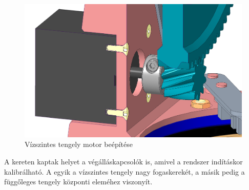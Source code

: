 \documentclass[12pt,a4paper]{article}
\begin{document}
\begin{figure}[h!]
	\centering
	\includegraphics[width=1 \linewidth]{mech_motorbeepites}
	\caption{Vízszintes tengely motor beépítése}
	\label{fig:mech_motorbeepites}
\end{figure}

A kereten kaptak helyet a végálláskapcsolók is, amivel a rendszer indításkor kalibrálható. A egyik a vízszintes tengely nagy fogaskerekét, a másik pedig a függőleges tengely központi eleméhez viszonyít.
\end{document}
